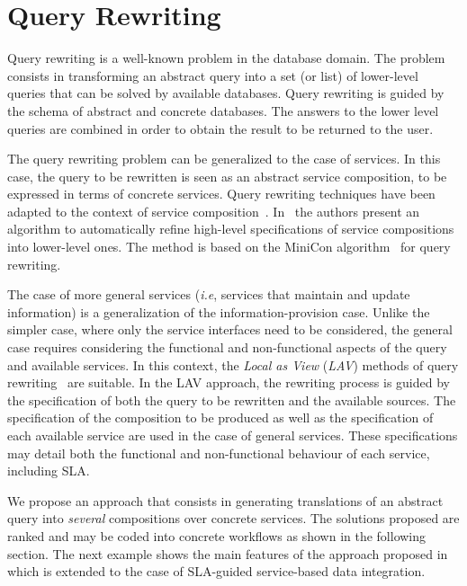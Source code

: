 \section{Query Rewriting}
\label{sec:queryRew}

Query rewriting is a well-known problem in the database domain.
The problem consists in transforming an abstract query into a set (or list) of lower-level queries that can be solved by  available databases.
Query rewriting is guided by the schema of  abstract and concrete databases.
The answers to the lower level queries are combined in order to obtain the result to be returned to the user.

The query rewriting problem can be generalized to the case of services.
In this case, the query to be rewritten is seen as an abstract service composition, to be expressed in terms of concrete services.
Query rewriting techniques have been adapted to the context of service composition~\cite{BBM10,ZLC11,CostaAMR13}. 
In~\cite{CostaAMR13} the authors present an algorithm to automatically refine high-level specifications of service compositions into lower-level ones. 
The method is based on the MiniCon algorithm~\cite{PH01} for query rewriting.

The case of more general services (\textit{i.e}, services that maintain and update information) is a generalization of the information-provision case.
Unlike the simpler case, where only the service interfaces need to be considered, the general case requires considering the functional and non-functional aspects of the query and available services.
In this context, the \textit{Local as View} (\textit{LAV}) methods of query rewriting~\cite{Levy2000} are suitable.
In the LAV approach, the rewriting process is guided by the specification of both the query to be rewritten and the available sources.
The specification of the composition to be produced as well as the specification of each available service are used in the case of general services.
These specifications may detail both the functional and non-functional behaviour of each service, including SLA.


We propose an approach that consists in generating translations of an abstract query into \textit{several}  compositions over concrete  services. 
The solutions proposed are ranked and may be coded into concrete workflows as shown in the following section.  The next example shows the main features of the approach proposed in~\cite{CostaAMR13} which is extended to the case of SLA-guided service-based data integration. 

